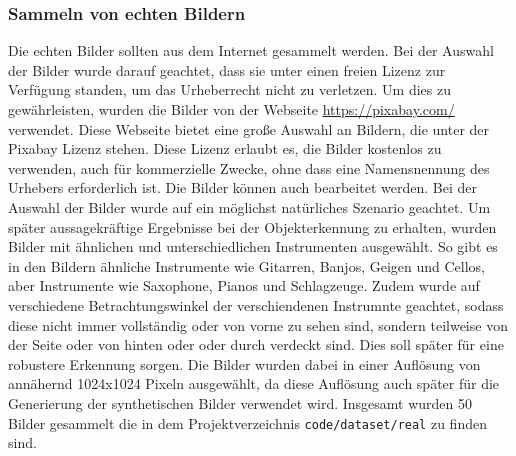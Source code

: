 \subsubsection{Sammeln von echten Bildern}
Die echten Bilder sollten aus dem Internet gesammelt werden. Bei der Auswahl der Bilder wurde darauf geachtet, dass sie unter einen freien Lizenz zur Verfügung standen, um das Urheberrecht nicht zu verletzen. Um dies zu gewährleisten, wurden die Bilder von der Webseite \url{https://pixabay.com/} verwendet. Diese Webseite bietet eine große Auswahl an Bildern, die unter der Pixabay Lizenz stehen. Diese Lizenz erlaubt es, die Bilder kostenlos zu verwenden, auch für kommerzielle Zwecke, ohne dass eine Namensnennung des Urhebers erforderlich ist. Die Bilder können auch bearbeitet werden.
Bei der Auswahl der Bilder wurde auf ein möglichst natürliches Szenario geachtet. Um später aussagekräftige Ergebnisse bei der Objekterkennung zu erhalten, wurden Bilder mit ähnlichen und unterschiedlichen Instrumenten ausgewählt. So gibt es in den Bildern ähnliche Instrumente wie Gitarren, Banjos, Geigen und Cellos, aber Instrumente wie Saxophone, Pianos und Schlagzeuge.
Zudem wurde auf verschiedene Betrachtungswinkel der verschiendenen Instrumnte geachtet, sodass diese nicht immer vollständig oder von vorne zu sehen sind, sondern teilweise von der Seite oder von hinten oder oder durch verdeckt sind. Dies soll später für eine robustere Erkennung sorgen. Die Bilder wurden dabei in einer Auflösung von annähernd 1024x1024 Pixeln ausgewählt, da diese Auflösung auch später für die Generierung der synthetischen Bilder verwendet wird. 
Insgesamt wurden 50 Bilder gesammelt die in dem Projektverzeichnis \texttt{code/dataset/real} zu finden sind.
